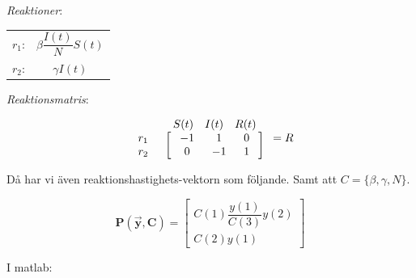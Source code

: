 \documentclass{article}
\begin{document}
\textit{Reaktioner}:
\begin{center}
\begin{tabular}{ c c }
 $r_1$: & $\beta\dfrac{I(t)}{N}S(t)$  \\  
 $r_2$: & $\gamma I(t)$  \\    
\end{tabular}
\end{center}

\textit{Reaktionsmatris}:
\begin{center}
\begin{equation*}
\begin{array}{c c} &
\begin{array}{c c c} S(t) & I(t) & R(t) \\
\end{array}
\\
\begin{array}{c c}
r_1 \\
r_2 
\end{array}
&
\left[
\begin{array}{c c c}
\; -1 \; & \;  1 \; & \; 0 \; \\
\;  0 \; & \; -1 \; & \; 1 \; 
\end{array}
\right]
\end{array} = R
\end{equation*}
\end{center}

Då har vi även reaktionshastighets-vektorn som följande. \newline
Samt att $C = \{ \beta, \gamma, N \}$.

\begin{equation*}
    \mathbf{P(\Vec{y}, C)}=
    \begin{bmatrix}
        C(1)\dfrac{y(1)}{C(3)}y(2) \\
        C(2)y(1)
    \end{bmatrix}
\end{equation*}

I matlab: 

\newline
\end{document}
